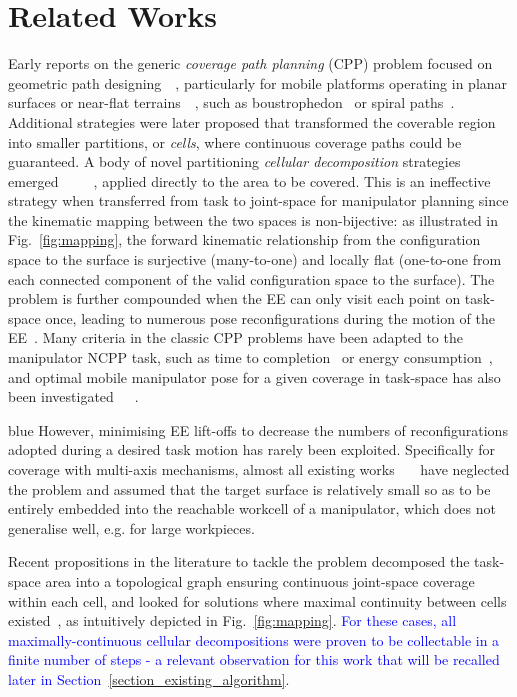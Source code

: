 \documentclass[journal]{IEEEtran}
\begin{document}
\section{Related Works}\label{section_related_works}


Early reports on the generic \textit{coverage path planning} (CPP) problem focused on geometric path designing~\cite{Kaljaca2020Coverage}~\cite{Oriolo2005Motion}, particularly for mobile platforms operating in planar surfaces or near-flat terrains~\cite{Eiben2020Problem}~\cite{Wu2019Energy}, such as boustrophedon~\cite{choset1998coverage} or spiral paths~\cite{hassan2018a}. 
Additional strategies were later proposed that transformed the coverable region into smaller partitions, or \textit{cells}, where continuous coverage paths could be guaranteed. A body of novel partitioning \textit{cellular decomposition} strategies emerged~\cite{Acar2002Morse}~\cite{Acar2006Sensor}~\cite{huang2001optimal}~\cite{Atkar2009Hierarchical}~\cite{Hassan2017Simultaneous}, applied directly to the area to be covered. This is an ineffective strategy when transferred from task to joint-space for manipulator planning since the kinematic mapping between the two spaces is non-bijective: as illustrated in Fig.~\ref{fig:mapping}, the forward kinematic relationship from the configuration space to the surface is surjective (many-to-one) and locally flat (one-to-one from each connected component of the valid configuration space to the surface). 
The problem is further compounded when the EE can only visit each point on task-space once, leading to numerous pose reconfigurations during the motion of the EE~\cite{rososhansky2011coverage}.
Many criteria in the classic CPP problems have been adapted to the manipulator NCPP task, such as time to completion~\cite{lu2020time} or energy consumption~\cite{Mei2006Deployment}, and optimal mobile manipulator pose for a given coverage in task-space has also been investigated~\cite{paus2017a}~\cite{Fan2021Base}~\cite{Kalawoun2018Optimal}.
\begin{color}{blue}
However, minimising EE lift-offs to decrease the numbers of reconfigurations adopted during a desired task motion has rarely been exploited. 
Specifically for coverage with multi-axis mechanisms, almost all existing works~\cite{Liu2020Optimal}~\cite{Zhou2016Sweep}~\cite{Bhatt2020Incorporating} have neglected the problem and assumed that the target surface is relatively small so as to be entirely embedded into the reachable workcell of a manipulator, which does not generalise well, e.g. for large workpieces. 
\end{color}
Recent propositions in the literature to tackle the problem decomposed the task-space area into a topological graph ensuring continuous joint-space coverage within each cell, and looked for solutions where maximal continuity between cells existed~\cite{Yang2020Cellular}, as intuitively depicted in Fig.~\ref{fig:mapping}. 
\textcolor{blue}{
For these cases, all maximally-continuous cellular decompositions were proven to be collectable in a finite number of steps - a relevant observation for this work that will be recalled later in Section~\ref{section_existing_algorithm}. }
\end{document}
